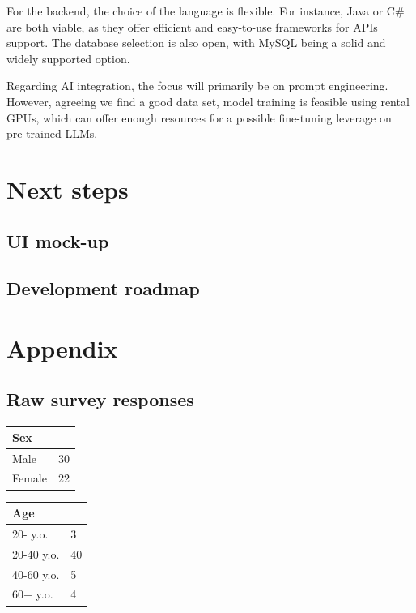\documentclass{article}
\begin{document}
For the backend, the choice of the language is flexible. For instance, Java or C\# are both viable, as they offer efficient and easy-to-use frameworks for APIs support.
The database selection is also open, with MySQL being a solid and widely supported option.

Regarding AI integration, the focus will primarily be on prompt engineering.
However, agreeing we find a good data set, model training is feasible using rental GPUs, which can offer enough resources for a possible fine-tuning leverage on pre-trained LLMs.

\section{Next steps}

\subsection{UI mock-up}

\subsection{Development roadmap}

\newpage
\section{Appendix}

\subsection{Raw survey responses}
\label{subsec:survey-responses}

\begin{table}[H]
    \centering
    \begin{tabularx}{0.9\textwidth}{X|p{1in}}
        \hline
        \multicolumn{2}{l}{\textbf{Sex}} \\
        \hline
        Male & 30 \\
        \hline
        Female & 22 \\
        \hline
    \end{tabularx}
\end{table}

\begin{table}[H]
    \centering
    \begin{tabularx}{0.9\textwidth}{X|p{1in}}
        \hline
        \multicolumn{2}{l}{\textbf{Age}} \\
        \hline
        20- y.o. & 3 \\
        \hline
        20-40 y.o. & 40 \\
        \hline
        40-60 y.o. & 5 \\
        \hline
        60+ y.o. & 4 \\
        \hline
    \end{tabularx}
\end{table}
\end{document}
